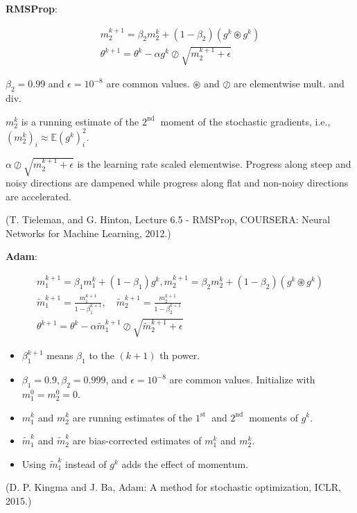 \documentclass{report}
\begin{document}
\begin{definition}[6.20][RMSProp]
    \textbf{RMSProp}:

    $$
    \begin{gathered}
    m_{2}^{k+1}=\beta_{2} m_{2}^{k}+\left(1-\beta_{2}\right)\left(g^{k} \circledast g^{k}\right) \\
    \theta^{k+1}=\theta^{k}-\alpha g^{k} \oslash \sqrt{m_{2}^{k+1}+\epsilon}
    \end{gathered}
    $$

    $\beta_{2}=0.99$ and $\epsilon=10^{-8}$ are common values. $\circledast$ and $\oslash$ are elementwise mult. and div.

    $m_{2}^{k}$ is a running estimate of the $2^{\text {nd }}$ moment of the stochastic gradients, i.e., $\left(m_{2}^{k}\right)_{i} \approx \mathbb{E}\left(g^{k}\right)_{i}^{2}$.

    $\alpha \oslash \sqrt{m_{2}^{k+1}+\epsilon}$ is the learning rate scaled elementwise. Progress along steep and noisy directions are dampened while progress along flat and non-noisy directions are accelerated.

    (T. Tieleman, and G. Hinton, Lecture 6.5 - RMSProp, COURSERA: Neural Networks for Machine Learning, 2012.)
\end{definition}

\begin{definition}
    \textbf{Adam}:

    $$
    \begin{gathered}
    m_{1}^{k+1}=\beta_{1} m_{1}^{k}+\left(1-\beta_{1}\right) g^{k}, m_{2}^{k+1}=\beta_{2} m_{2}^{k}+\left(1-\beta_{2}\right)\left(g^{k} \circledast g^{k}\right) \\
    \tilde{m}_{1}^{k+1}=\frac{m_{1}^{k+1}}{1-\beta_{1}^{k+1}}, \quad \widetilde{m}_{2}^{k+1}=\frac{m_{2}^{k+1}}{1-\beta_{2}^{k+1}} \\
    \theta^{k+1}=\theta^{k}-\alpha \widetilde{m}_{1}^{k+1} \oslash \sqrt{\widetilde{m}_{2}^{k+1}+\epsilon}
    \end{gathered}
    $$

    \begin{itemize}
        \item $\beta_{1}^{k+1}$ means $\beta_{1}$ to the $(k+1)$ th power.
        \item $\beta_{1}=0.9, \beta_{2}=0.999$, and $\epsilon=10^{-8}$ are common values. Initialize with $m_{1}^{0}=m_{2}^{0}=0$.
        \item $m_{1}^{k}$ and $m_{2}^{k}$ are running estimates of the $1^{\text {st }}$ and $2^{\text {nd }}$ moments of $g^{k}$.
        \item $\tilde{m}_{1}^{k}$ and $\tilde{m}_{2}^{k}$ are bias-corrected estimates of $m_{1}^{k}$ and $m_{2}^{k}$.
        \item Using $\widetilde{m}_{1}^{k}$ instead of $g^{k}$ adds the effect of momentum.
    \end{itemize}

    (D. P. Kingma and J. Ba, Adam: A method for stochastic optimization, ICLR, 2015.)
\end{definition}
\end{document}
